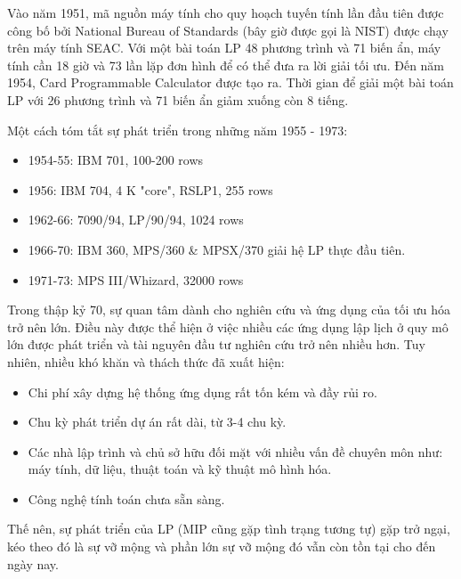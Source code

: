 
Vào năm 1951, mã nguồn máy tính cho quy hoạch tuyến tính lần đầu tiên được công bố bởi National Bureau of Standards (bây giờ được gọi là NIST) được chạy trên máy tính SEAC. Với một bài toán LP 48 phương trình và 71 biến ẩn, máy tính cần 18 giờ và 73 lần lặp đơn hình để có thể đưa ra lời giải tối ưu. Đến năm 1954, Card Programmable Calculator được tạo ra. Thời gian để giải một bài toán LP với 26 phương trình và 71 biến ẩn giảm xuống còn 8 tiếng.

Một cách tóm tắt sự phát triển trong những năm 1955 - 1973:
\begin{itemize}
    \item 1954-55: IBM 701, 100-200 rows
    \item 1956: IBM 704, 4 K "core", RSLP1, 255 rows
    \item 1962-66: 7090/94, LP/90/94, 1024 rows
    \item 1966-70: IBM 360, MPS/360 \& MPSX/370 giải hệ LP thực đầu tiên.
    \item 1971-73: MPS III/Whizard, 32000 rows
\end{itemize}

Trong thập kỷ 70, sự quan tâm dành cho nghiên cứu và ứng dụng của tối ưu hóa trở nên lớn. Điều này được thể hiện ở việc nhiều các ứng dụng lập lịch ở quy mô lớn được phát triển và tài nguyên đầu tư nghiên cứu trở nên nhiều hơn. Tuy nhiên, nhiều khó khăn và thách thức đã xuất hiện:
\begin{itemize}
    \item Chi phí xây dựng hệ thống ứng dụng rất tốn kém và đầy rủi ro.
    \item Chu kỳ phát triển dự án rất dài, từ 3-4 chu kỳ.
    \item Các nhà lập trình và chủ sở hữu đối mặt với nhiều vấn đề chuyên môn như: máy tính, dữ liệu, thuật toán và kỹ thuật mô hình hóa.
    \item Công nghệ tính toán chưa sẵn sàng.
\end{itemize}
Thế nên, sự phát triển của LP (MIP cũng gặp tình trạng tương tự) gặp trở ngại, kéo theo đó là sự vỡ mộng và phần lớn sự vỡ mộng đó vẫn còn tồn tại cho đến ngày nay.

